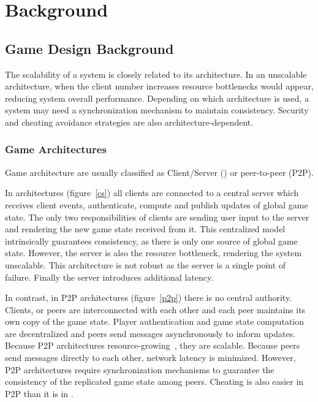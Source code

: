 \chapter{Background}
\label{background}


\section{Game Design Background}
\label{gamedesignbg}

The scalability of a system is closely related to its architecture. In an unscalable architecture, when the client number increases resource bottlenecks would appear, reducing system overall performance. Depending on which architecture is used, a system may need a synchronization mechanism to maintain consistency. Security and cheating avoidance strategies are also architecture-dependent.

\subsection{Game Architectures}
\label{game_archi}

Game architecture are usually classified as Client\slash Server (\cs) or peer-to-peer (P2P). 

In {\cs} architectures (figure~\ref{cs}) all clients are connected to a central server which receives client events, authenticate, compute and publish updates of global game state. The only two responsibilities of clients are sending user input to the server and rendering the new game state received from it. This centralized model intrinsically guarantees consistency, as there is only one source of global game state. However, the server is also the resource bottleneck, rendering the system unscalable. This architecture is not robust as the server is a single point of failure. Finally the server introduces additional latency.

In contrast, in P2P architectures (figure~\ref{p2p}) there is no central authority. Clients, or peers are interconnected with each other and each peer maintains its own copy of the game state. Player authentication and game state computation are decentralized and peers send messages asynchronously to inform updates. Because P2P architectures resource-growing~\cite{Scheating}, they are scalable. Because peers send messages directly to each other, network latency is minimized. However, P2P architectures require synchronization mechanisms to guarantee the consistency of the replicated game state among peers. Cheating is also easier in P2P than it is in {\cs}.


